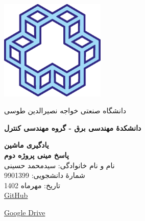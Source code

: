 \begin{titlepage}
\begin{center}
\centerline{{\includegraphics[width=5cm]{img/Logo.png}}}
\centerline{\textcolor[rgb]{0,0,0.5}{\nast \large  دانشگاه صنعتی خواجه نصیرالدین طوسی}}
\centerline{\textcolor[rgb]{0,0,0.5}{\nast \bfseries دانشکدۀ مهندسی برق - گروه مهندسی کنترل}}

\vfill
        
\Huge
\textbf{یادگیری ماشین}\\
\textbf{پاسخ مینی پروژه دوم}\\
        
\vfill
\large
    نام و نام خانوادگی:  سیدمحمد حسینی\\
    شمارۀ دانشجویی: 9901399\\
    تاریخ: مهرماه 1402\\

\href{https://github.com/mamdaliof/MachineLearning2024W}{GitHub}

\href{https://drive.google.com/drive/folders/10-8uiqpIUbC2HcEtwjqP1IAix46nCrbL?usp=sharing}{Google Drive}


\end{center}
\end{titlepage}

